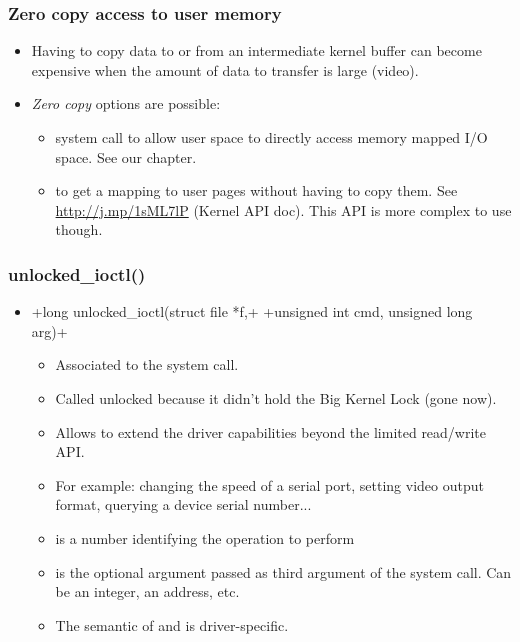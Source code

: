 \begin{frame}
  \frametitle{Zero copy access to user memory}
  \begin{itemize}
  \item Having to copy data to or from an intermediate kernel buffer
    can become expensive when the amount of data to transfer is
    large (video).
  \item \emph{Zero copy} options are possible:
    \begin{itemize}
    \item {} system call to allow user space to directly
      access memory mapped I/O space. See our  chapter.
    \item {} to get a mapping to user pages
      without having to copy them. See \url{http://j.mp/1sML7lP}
      (Kernel API doc). This API is more complex to use though.
    \end{itemize}
  \end{itemize}
\end{frame}

\begin{frame}[fragile]
  \frametitle{unlocked\_ioctl()}
  \begin{itemize}
  \item {}+long unlocked_ioctl(struct file *f,+
    +unsigned int cmd, unsigned long arg)+
    \begin{itemize}
    \item Associated to the  system call.
    \item Called unlocked because it didn't hold the Big Kernel Lock
      (gone now).
    \item Allows to extend the driver capabilities beyond the limited
      read/write API.
    \item For example: changing the speed of a serial port, setting
      video output format, querying a device serial number...
    \item {} is a number identifying the operation to perform
    \item {} is the optional argument passed as third argument
      of the  system call. Can be an integer, an
      address, etc.
    \item The semantic of  and  is
      driver-specific.
    \end{itemize}
  \end{itemize}
\end{frame}

